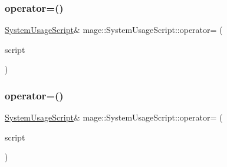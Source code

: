 \hypertarget{classmage_1_1_system_usage_script_a3ca814599a30991f3e6068cec2b876df}{}\label{classmage_1_1_system_usage_script_a3ca814599a30991f3e6068cec2b876df} 
\subsubsection{\texorpdfstring{operator=()}{operator=()}\hspace{0.1cm}{\footnotesize\ttfamily [1/2]}}
{\footnotesize\ttfamily \hyperlink{classmage_1_1_system_usage_script}{System\+Usage\+Script}\& mage\+::\+System\+Usage\+Script\+::operator= (\begin{DoxyParamCaption}\item[{const \hyperlink{classmage_1_1_system_usage_script}{System\+Usage\+Script} \&}]{script }\end{DoxyParamCaption})\hspace{0.3cm}{\ttfamily [delete]}}

\hypertarget{classmage_1_1_system_usage_script_ad9c1a2f19c6d79adbd32789e479e1427}{}\label{classmage_1_1_system_usage_script_ad9c1a2f19c6d79adbd32789e479e1427} 
\subsubsection{\texorpdfstring{operator=()}{operator=()}\hspace{0.1cm}{\footnotesize\ttfamily [2/2]}}
{\footnotesize\ttfamily \hyperlink{classmage_1_1_system_usage_script}{System\+Usage\+Script}\& mage\+::\+System\+Usage\+Script\+::operator= (\begin{DoxyParamCaption}\item[{\hyperlink{classmage_1_1_system_usage_script}{System\+Usage\+Script} \&\&}]{script }\end{DoxyParamCaption})\hspace{0.3cm}{\ttfamily [delete]}}

\hypertarget{classmage_1_1_system_usage_script_af7189c6e81dabfe077710ed9f3c7cd09}{}\label{classmage_1_1_system_usage_script_af7189c6e81dabfe077710ed9f3c7cd09} 
